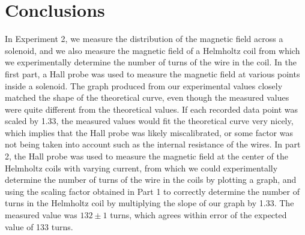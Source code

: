 \documentclass[letterpaper]{article}
\begin{document}
\section{Conclusions}

In Experiment 2, we measure the distribution of the magnetic field across a solenoid,
and we also measure the magnetic field of a Helmholtz coil from which we experimentally determine the
number of turns of the wire in the coil. In the first part, a Hall probe was used to measure the magnetic field
at various points inside a solenoid. The graph produced from our experimental values
closely matched the shape of the theoretical curve, even though the measured values were
quite different from the theoretical values. If each recorded
data point was scaled by 1.33, the measured values would fit the
theoretical curve very nicely, which implies that the Hall probe
was likely miscalibrated, or some factor was not being taken into account such as the internal resistance
of the wires. In part 2, the Hall probe was used to measure the magnetic field
at the center of the Helmholtz coils with varying current, from which we could experimentally
determine the number of turns of the wire in the coils by plotting a graph, and using the scaling factor obtained in Part 1
to correctly determine the number of turns in the Helmholtz coil by multiplying the slope of our graph by 1.33. The measured value was $132 \pm 1$ turns, which agrees
within error of the expected value of 133 turns.


\end{document}
